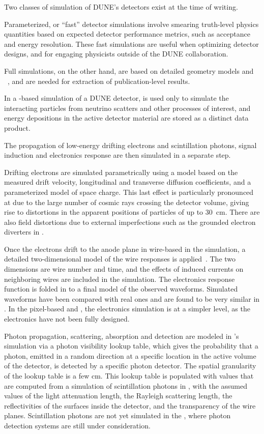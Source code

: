 \documentclass[../main-v1.tex]{subfiles}
\begin{document}
Two classes of simulation of DUNE's detectors exist at the time of writing. 

Parameterized, or ``fast'' detector simulations involve smearing truth-level physics quantities based on expected detector performance metrics, such as acceptance and energy resolution.  These fast simulations are useful when optimizing detector designs, and for engaging physicists outside of the DUNE collaboration.  

Full simulations, on the other hand, are based on detailed geometry models and ~\cite{Agostinelli:2002hh,Allison:2016lfl}, and are needed for extraction of publication-level results.

In a -based simulation of a DUNE detector,  is used only to simulate the interacting particles from neutrino scatters and other processes of interest, and energy depositions in the active detector material are stored as a distinct data product. 

The propagation of low-energy drifting electrons and scintillation photons, signal induction  and electronics response are then simulated in a separate step.  

Drifting electrons are simulated parametrically using a model based on the measured drift velocity, longitudinal and transverse diffusion coefficients, and a parameterized model of space charge.  This last effect is particularly pronounced at  due to the large number of cosmic rays crossing the detector volume, giving rise to distortions in the apparent positions of particles of up to 30~cm.  There are also field distortions due to external imperfections such as the grounded electron diverters in .

Once the electrons drift to the anode plane in wire-based  in the simulation, a detailed two-dimensional model of the wire responses is applied~\cite{Abi:2020mwi}.  The two dimensions are wire number and time, and the effects of induced currents on neighboring wires are included in the simulation.  The electronics response function is folded in to a final model of the observed waveforms.  Simulated waveforms have been compared with real ones and are found to be very similar in .
In the pixel-based  and , the electronics simulation is at a simpler level, as the electronics have not been fully designed.


Photon propagation, scattering, absorption and detection are modeled in 's simulation via a photon visibility lookup table, which gives the probability that a photon, emitted in a random direction at a specific location in the active volume of the detector, is detected by a specific photon detector.  The spatial granularity of the lookup table is a few cm.  This lookup table is populated with values that are computed from a  simulation of scintillation photons in , with the assumed values of the light attenuation length, the Rayleigh scattering length, the reflectivities of the surfaces inside the detector, and the transparency of the wire planes.  Scintillation photons are not yet simulated in the , where photon detection systems are still under consideration. 
\end{document}
